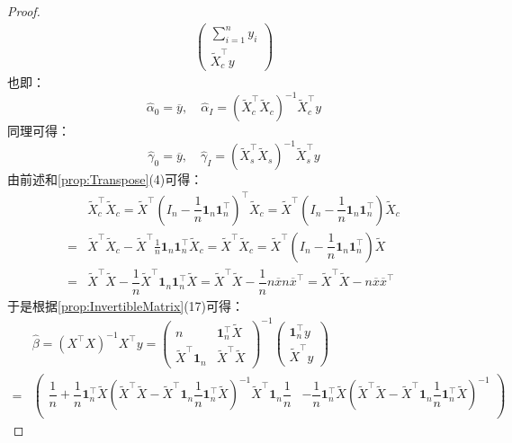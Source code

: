 \begin{proof}
\begin{gather*}
		\begin{pmatrix}
			\sum\limits_{i=1}^{n}y_i \\
			\tilde{X}_c^{\top}y
		\end{pmatrix} 
	\end{gather*}
	也即：
	\begin{equation*}
		\hat{\alpha}_0=\overline{y},\quad\hat{\alpha}_I=(\tilde{X}_c^{\top}\tilde{X}_c)^{-1}\tilde{X}_c^{\top}y
	\end{equation*}
	同理可得：
	\begin{equation*}
		\hat{\gamma}_0=\overline{y},\quad\hat{\gamma}_I=(\tilde{X}_s^{\top}\tilde{X}_s)^{-1}\tilde{X}_s^{\top}y
	\end{equation*}
	由前述和\cref{prop:Transpose}(4)可得：
	\begin{align*}
		&\tilde{X}_c^{\top}\tilde{X}_c=\tilde{X}^{\top}\left(I_n-\dfrac{1}{n}\mathbf{1}_n\mathbf{1}_n^{\top}\right)^{\top}\tilde{X}_c=\tilde{X}^{\top}\left(I_n-\dfrac{1}{n}\mathbf{1}_n\mathbf{1}_n^{\top}\right)\tilde{X}_c \\
		=&\tilde{X}^{\top}\tilde{X}_c-\tilde{X}^{\top}\frac{1}{n}\mathbf{1}_n\mathbf{1}_n^{\top}\tilde{X}_c=\tilde{X}^{\top}\tilde{X}_c=\tilde{X}^{\top}\left(I_n-\dfrac{1}{n}\mathbf{1}_n\mathbf{1}_n^{\top}\right)\tilde{X} \\
		=&\tilde{X}^{\top}\tilde{X}-\dfrac{1}{n}\tilde{X}^{\top}\mathbf{1}_n\mathbf{1}_n^{\top}\tilde{X}=\tilde{X}^{\top}\tilde{X}-\dfrac{1}{n}n\overline{x}n\overline{x}^{\top}=\tilde{X}^{\top}\tilde{X}-n\overline{x}\overline{x}^{\top}
	\end{align*}
	于是根据\cref{prop:InvertibleMatrix}(17)可得：
	\begin{align*}
		&\hat{\beta}=(X^{\top}X)^{-1}X^{\top}y=
		\begin{pmatrix}
			n & \mathbf{1}_{n}^{\top}\tilde{X} \\
			\tilde{X}^{\top}\mathbf{1}_n & \tilde{X}^{\top}\tilde{X}
		\end{pmatrix}^{-1}
		\begin{pmatrix}
			\mathbf{1}_n^{\top}y \\
			\tilde{X}^{\top}y
		\end{pmatrix} \\
		=&
		\begin{pmatrix}
			\dfrac{1}{n}+\dfrac{1}{n}\mathbf{1}_{n}^{\top}\tilde{X}( \tilde{X}^{\top}\tilde{X}-\tilde{X}^{\top}\mathbf{1}_n\dfrac{1}{n}\mathbf{1}_{n}^{\top}\tilde{X})^{-1}\tilde{X}^{\top}\mathbf{1}_n\dfrac{1}{n} & -\dfrac{1}{n}\mathbf{1}_{n}^{\top}\tilde{X}(\tilde{X}^{\top}\tilde{X}-\tilde{X}^{\top}\mathbf{1}_n\dfrac{1}{n}\mathbf{1}_{n}^{\top}\tilde{X})^{-1} \\

\end{pmatrix}
\end{align*}
\end{proof}
